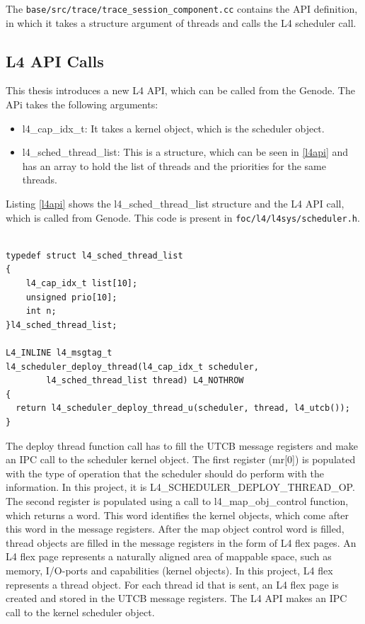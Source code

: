 The \texttt{base/src/trace/trace\_session\_component.cc} contains the API definition, in which it takes a structure argument of threads and calls the L4 scheduler call.

\subsection{L4 API Calls} \label{imp:l4api}
This thesis introduces a new L4 API, which can be called from the Genode. The APi takes the following arguments:

\begin{itemize}
\item l4\_cap\_idx\_t: It takes a kernel object, which is the scheduler object.  

\item l4\_sched\_thread\_list: This is a structure, which can be seen in \ref{l4api} and has an array to hold the list of threads and the priorities for the same threads. 

\end{itemize}

Listing \ref{l4api} shows the l4\_sched\_thread\_list structure and the L4 API call, which is called from Genode. This code is present in \texttt{foc/l4/l4sys/scheduler.h}.
\begin{lstlisting}[caption={L4 scheduler API in scheduler.h},label={l4api}, style=customcpp]

typedef struct l4_sched_thread_list
{
	l4_cap_idx_t list[10];
	unsigned prio[10];
	int n;
}l4_sched_thread_list;

L4_INLINE l4_msgtag_t
l4_scheduler_deploy_thread(l4_cap_idx_t scheduler,
		l4_sched_thread_list thread) L4_NOTHROW
{
  return l4_scheduler_deploy_thread_u(scheduler, thread, l4_utcb());
}
\end{lstlisting}

The deploy thread function call has to fill the UTCB message registers and make an IPC call to the scheduler kernel object. The first register (mr[0]) is populated with the type of operation that the scheduler should do perform with the information. In this project, it is L4\_SCHEDULER\_DEPLOY\_THREAD\_OP. The second register is populated using a call to l4\_map\_obj\_control function, which returns a word. This word identifies the kernel objects, which come after this word in the message registers. After the map object control word is filled, thread objects are filled in the message registers in the form of L4 flex pages. An L4 flex page represents a naturally aligned area of mappable space, such as memory, I/O-ports and capabilities (kernel objects). In this project, L4 flex represents a thread object.
For each thread id that is sent, an L4 flex page is created and stored in the UTCB message registers. The L4 API makes an IPC call to the kernel scheduler object. 

